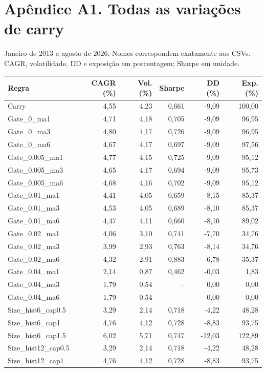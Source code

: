 \documentclass[11pt,a4paper]{article}
\begin{document}
\section*{Apêndice A1. Todas as variações de carry}Janeiro de 2013 a agosto de 2026. Nomes correspondem exatamente aos CSVs. CAGR, volatilidade, DD e exposição em porcentagem; Sharpe em unidade.\par \small\begin{center}\begin{tabular}{lrrrrr}\toprule
Regra & CAGR (\%) & Vol. (\%) & Sharpe & DD (\%) & Exp. (\%) \\ \midrule
Carry & 4,55 & 4,23 & 0,661 & -9,09 & 100,00 \\
Gate\_0\_ma1 & 4,71 & 4,18 & 0,705 & -9,09 & 96,95 \\
Gate\_0\_ma3 & 4,80 & 4,17 & 0,726 & -9,09 & 96,95 \\
Gate\_0\_ma6 & 4,67 & 4,17 & 0,697 & -9,09 & 97,56 \\
Gate\_0.005\_ma1 & 4,77 & 4,15 & 0,725 & -9,09 & 95,12 \\
Gate\_0.005\_ma3 & 4,65 & 4,17 & 0,694 & -9,09 & 95,73 \\
Gate\_0.005\_ma6 & 4,68 & 4,16 & 0,702 & -9,09 & 95,12 \\
Gate\_0.01\_ma1 & 4,41 & 4,05 & 0,659 & -8,15 & 85,37 \\
Gate\_0.01\_ma3 & 4,53 & 4,05 & 0,689 & -8,10 & 85,37 \\
Gate\_0.01\_ma6 & 4,47 & 4,11 & 0,660 & -8,10 & 89,02 \\
Gate\_0.02\_ma1 & 4,06 & 3,10 & 0,741 & -7,70 & 34,76 \\
Gate\_0.02\_ma3 & 3,99 & 2,93 & 0,763 & -8,14 & 34,76 \\
Gate\_0.02\_ma6 & 4,32 & 2,91 & 0,883 & -6,78 & 35,37 \\
Gate\_0.04\_ma1 & 2,14 & 0,87 & 0,462 & -0,03 & 1,83 \\
Gate\_0.04\_ma3 & 1,79 & 0,54 & -- & 0,00 & 0,00 \\
Gate\_0.04\_ma6 & 1,79 & 0,54 & -- & 0,00 & 0,00 \\
Size\_hist6\_cap0.5 & 3,29 & 2,14 & 0,718 & -4,22 & 48,28 \\
Size\_hist6\_cap1 & 4,76 & 4,12 & 0,728 & -8,83 & 93,75 \\
Size\_hist6\_cap1.5 & 6,02 & 5,71 & 0,747 & -12,03 & 122,89 \\
Size\_hist12\_cap0.5 & 3,29 & 2,14 & 0,718 & -4,22 & 48,28 \\
Size\_hist12\_cap1 & 4,76 & 4,12 & 0,728 & -8,83 & 93,75 \\
\bottomrule\end{tabular}\end{center}\normalsize
\end{document}
